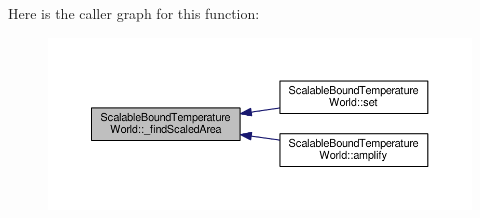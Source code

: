 Here is the caller graph for this function\-:
\nopagebreak
\begin{figure}[H]
\begin{center}
\leavevmode
\includegraphics[width=350pt]{class_scalable_bound_temperature_world_a418f5c5ca361cea3cfc189ae22b35130_icgraph}
\end{center}
\end{figure}


